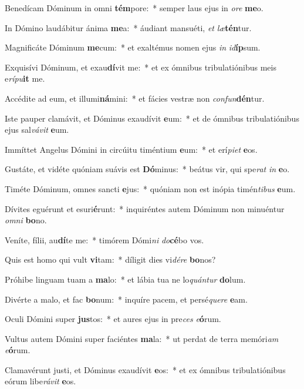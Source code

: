 \item Benedícam Dóminum in omni \textbf{tém}pore:~* semper laus ejus in \textit{o}\textit{re} \textbf{me}o.
\item In Dómino laudábitur ánima \textbf{me}a:~* áudiant mansuéti, \textit{et} \textit{læ}\textbf{tén}tur.
\item Magnificáte Dóminum \textbf{me}cum:~* et exaltémus nomen ejus \textit{in} \textit{id}\textbf{íp}sum.
\item Exquisívi Dóminum, et exau\textbf{dí}vit me:~* et ex ómnibus tribulatiónibus meis e\textit{rí}\textit{pu}\textbf{it} me.
\item Accédite ad eum, et illumi\textbf{ná}mini:~* et fácies vestræ non \textit{con}\textit{fun}\textbf{dén}tur.
\item Iste pauper clamávit, et Dóminus exaudívit \textbf{e}um:~* et de ómnibus tribulatiónibus ejus sal\textit{vá}\textit{vit} \textbf{e}um.
\item Immíttet Angelus Dómini in circúitu timéntium \textbf{e}um:~* et erí\textit{pi}\textit{et} \textbf{e}os.
\item Gustáte, et vidéte quóniam suávis est \textbf{Dó}minus:~* beátus vir, qui spe\textit{rat} \textit{in} \textbf{e}o.
\item Timéte Dóminum, omnes sancti \textbf{e}jus:~* quóniam non est inópia timén\textit{ti}\textit{bus} \textbf{e}um.
\item Dívites eguérunt et esuri\textbf{é}runt:~* inquiréntes autem Dóminum non minuéntur \textit{om}\textit{ni} \textbf{bo}no.
\item Veníte, fílii, au\textbf{dí}te me:~* timórem Dómi\textit{ni} \textit{do}\textbf{cé}bo vos.
\item Quis est homo qui vult \textbf{vi}tam:~* díligit dies vi\textit{dé}\textit{re} \textbf{bo}nos?
\item Próhibe linguam tuam a \textbf{ma}lo:~* et lábia tua ne lo\textit{quán}\textit{tur} \textbf{do}lum.
\item Divérte a malo, et fac \textbf{bo}num:~* inquíre pacem, et persé\textit{que}\textit{re} \textbf{e}am.
\item Oculi Dómini super \textbf{jus}tos:~* et aures ejus in pre\textit{ces} \textit{e}\textbf{ó}rum.
\item Vultus autem Dómini super faciéntes \textbf{ma}la:~* ut perdat de terra memóri\textit{am} \textit{e}\textbf{ó}rum.
\item Clamavérunt justi, et Dóminus exaudívit \textbf{e}os:~* et ex ómnibus tribulatiónibus eórum libe\textit{rá}\textit{vit} \textbf{e}os.
